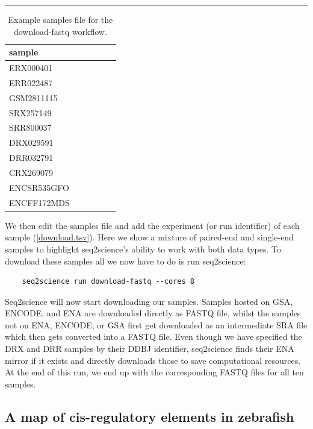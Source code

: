\begin{table}[t]
    \hrule height 0.05cm  \vspace{0.01cm}
	\caption{\label{download.tsv}Example samples file for the download-fastq workflow. }
	\centering
    {\begin{tabular}{|l|l|l|l|l|l|}
    \hline
        sample \\  \hline
        ERX000401 \\ \hline
        ERR022487 \\ \hline
        GSM2811115 \\ \hline
        SRX257149 \\ \hline
        SRR800037 \\ \hline
        DRX029591 \\ \hline
        DRR032791 \\ \hline
        CRX269079 \\ \hline
        ENCSR535GFO \\ \hline
        ENCFF172MDS \\ \hline
    \end{tabular}}
\end{table}

We then edit the samples file and add the experiment (or run identifier) of each sample (\autoref{download.tsv}). Here we show a mixture of paired-end and single-end samples to highlight seq2science's ability to work with both data types. To download these samples all we now have to do is run seq2science:

\begin{verbatim}
    seq2science run download-fastq --cores 8
\end{verbatim}

Seq2science will now start downloading our samples. Samples hosted on GSA, ENCODE, and ENA are downloaded directly as FASTQ file, whilst the samples not on ENA, ENCODE, or GSA first get downloaded as an intermediate SRA file which then gets converted into a FASTQ file. Even though we have specified the DRX and DRR samples by their DDBJ identifier, seq2science finds their ENA mirror if it exists and directly downloads those to save computational resources. At the end of this run, we end up with the corresponding FASTQ files for all ten samples.

\subsection{A map of cis-regulatory elements in zebrafish}

